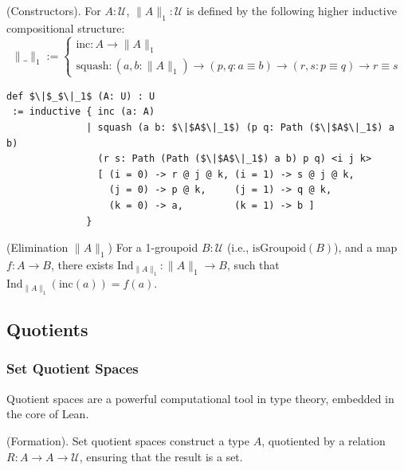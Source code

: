 \documentclass{article}
\begin{document}
\begin{definition} (Constructors).
For \( A : \mathcal{U} \), \( \| A \|_1 : \mathcal{U} \) is defined by the following higher
inductive compositional structure:
\[
\| \_ \|_1 :=
\begin{cases}
\text{inc} : A \to \| A \|_1 \\
\text{squash} : (a, b : \| A \|_1) \to (p, q : a \equiv b) \to (r, s : p \equiv q) \to r \equiv s
\end{cases}
\]
\begin{lstlisting}[mathescape=true]
def $\|$_$\|_1$ (A: U) : U
 := inductive { inc (a: A)
              | squash (a b: $\|$A$\|_1$) (p q: Path ($\|$A$\|_1$) a b)
                (r s: Path (Path ($\|$A$\|_1$) a b) p q) <i j k>
                [ (i = 0) -> r @ j @ k, (i = 1) -> s @ j @ k,
                  (j = 0) -> p @ k,     (j = 1) -> q @ k,
                  (k = 0) -> a,         (k = 1) -> b ]
              }
\end{lstlisting}
\end{definition}

\begin{theorem} (Elimination \( \| A \|_1 \))
For a 1-groupoid \( B : \mathcal{U} \) (i.e., \( \text{isGroupoid}(B) \)),
and a map \( f : A \to B \), there exists \( \text{Ind}_{\|A\|_1} : \|A\|_1 \to B \),
such that \( \text{Ind}_{\|A\|_1}(\text{inc}(a)) = f(a) \).
\end{theorem}

\newpage
\subsection{Quotients}
\subsubsection*{Set Quotient Spaces}
Quotient spaces are a powerful computational tool in type theory, embedded
in the core of Lean.
\begin{definition} (Formation).
Set quotient spaces construct a type \( A \), quotiented by
a relation \( R : A \to A \to \mathcal{U} \), ensuring that the result is a set.
\end{definition}
\end{document}
